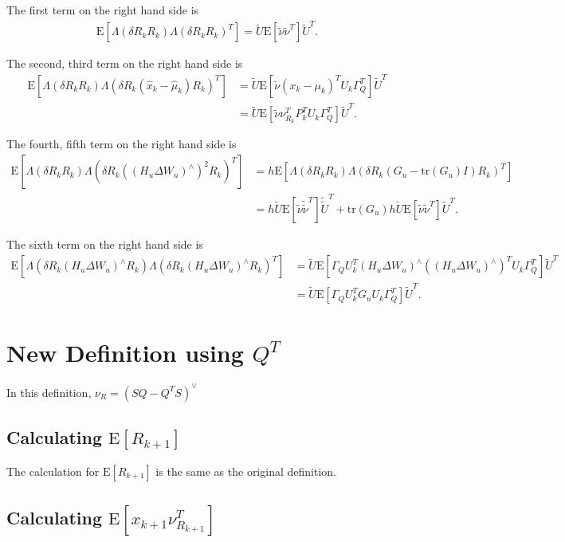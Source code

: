 \documentclass[10pt]{article}
\newcommand{\tr}[1]{\ensuremath{\mathrm{tr}\left( #1 \right)}}
\newcommand{\expect}[1]{\ensuremath{\mathrm{E}\left[ #1 \right]}}
\begin{document}
\noindent The first term on the right hand side is
\begin{align*}
	\expect{\Lambda(\delta R_kR_k)\Lambda(\delta R_kR_k)^T} = \tilde{U}\expect{\tilde{\nu}\tilde{\nu}^T}\tilde{U}^T.
\end{align*}

\noindent The second, third term on the right hand side is
\begin{align*}
	\expect{\Lambda(\delta R_kR_k)\Lambda(\delta R_k(\hat{x}_k-\hat{\mu}_k)R_k)^T} &= \tilde{U}\expect{\tilde{\nu}(x_k-\mu_k)^TU_k\Gamma_Q^T}\tilde{U}^T \\
	&= \tilde{U}\expect{\tilde{\nu}\nu_{R_k}^TP_k^TU_k\Gamma_Q^T}\tilde{U}^T.
\end{align*}

\noindent The fourth, fifth term on the right hand side is
\begin{align*}
	\expect{\Lambda(\delta R_kR_k)\Lambda(\delta R_k((H_u\Delta W_u)^\wedge)^2R_k)^T} &= h\expect{\Lambda(\delta R_kR_k) \Lambda(\delta R_k(G_u-\tr{G_u}I)R_k)^T} \\
	&= h\tilde{U}\expect{\tilde{\nu}\tilde{\tilde{\nu}}^T}\tilde{\tilde{U}}^T + \tr{G_u}h\tilde{U}\expect{\tilde{\nu}\tilde{\nu}^T}\tilde{U}^T.
\end{align*}

\noindent The sixth term on the right hand side is
\begin{align*}
	\expect{\Lambda(\delta R_k(H_u\Delta W_u)^\wedge R_k)\Lambda(\delta R_k(H_u\Delta W_u)^\wedge R_k)^T} &= \tilde{U}\expect{\Gamma_QU_k^T(H_u\Delta W_u)^\wedge((H_u\Delta W_u)^\wedge)^TU_k\Gamma_Q^T}\tilde{U}^T \\
	&= \tilde{U}\expect{\Gamma_QU_k^TG_uU_k\Gamma_Q^T}\tilde{U}^T.
\end{align*}

\section{New Definition using $Q^T$}

In this definition, $\nu_R = (SQ-Q^TS)^\vee$

\subsection{Calculating $\expect{R_{k+1}}$}

The calculation for $\expect{R_{k+1}}$ is the same as the original definition.

\subsection{Calculating $\expect{x_{k+1}\nu_{R_{k+1}}^T}$}
\end{document}
